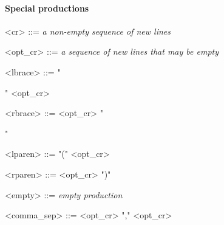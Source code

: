 \paragraph{Special productions}

\begin{grammar}
  <cr> ::= \emph{a non-empty sequence of new lines}

  <opt_cr> ::= \emph{a sequence of new lines that may be empty}

  <lbrace> ::= "{" <opt_cr>

  <rbrace> ::= <opt_cr> "}"

  <lparen> ::= "(" <opt_cr>

  <rparen> ::= <opt_cr> ")"

  <empty> ::= \emph{empty production}

  <comma_sep> ::= <opt_cr> "," <opt_cr>
\end{grammar}
